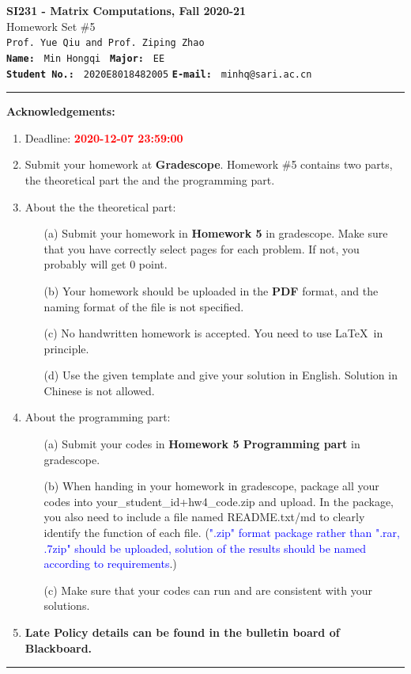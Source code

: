 \documentclass[english,onecolumn]{IEEEtran}
\begin{document}
\begin{center}
	\textbf{\LARGE{SI231 - Matrix Computations, Fall 2020-21}}\\
	{\Large Homework Set \#5}\\
	\texttt{Prof. Yue Qiu and Prof. Ziping Zhao}\\
	\texttt{\textbf{Name:}}   	\texttt{ Min Hongqi }  		\hspace{1bp}
	\texttt{\textbf{Major:}}  	\texttt{ EE } 	\\
	\texttt{\textbf{Student No.:}} 	\texttt{ 2020E8018482005}     \hspace{1bp}
	\texttt{\textbf{E-mail:}} 	\texttt{ minhq@sari.ac.cn}
\par\end{center}

\noindent
\rule{\linewidth}{0.4pt}
{\bf {\large Acknowledgements:}}
\begin{enumerate}
    \item Deadline: \textcolor{red}{\textbf{2020-12-07 23:59:00}}
    \item Submit your homework at \textbf{Gradescope}.
    Homework \#5 contains two parts, the theoretical part the and the programming part.
    \item About the the theoretical part:
    \begin{enumerate}
            \item[(a)] Submit your homework in \textbf{Homework 5} in gradescope. Make sure that you have correctly select pages for each problem. If not, you probably will get 0 point.
            \item[(b)] Your homework should be uploaded in the \textbf{PDF} format, and the naming format of the file is not specified.
            \item[(c)] No handwritten homework is accepted. You need to use \LaTeX $\,$ in principle.
            \item[(d)] Use the given template and give your solution in English. Solution in Chinese is not allowed. 
        \end{enumerate}
  \item About the programming part:
  \begin{enumerate}
      \item[(a)] Submit your codes in \textbf{Homework 5 Programming part} in gradescope. 
      \item[(b)] When handing in your homework in gradescope, package all your codes into {\sf your\_student\_id+hw4\_code.zip} and upload. In the package, you also need to include a file named {\sf README.txt/md} to clearly identify the function of each file. (\textcolor{blue}{".zip" format package rather than ".rar, .7zip" should be uploaded, solution of the results should be named according to requirements}.)
     \item[(c)] Make sure that your codes can run and are consistent with your solutions.
  \end{enumerate}
  \item \textbf{Late Policy details can be found in the bulletin board of Blackboard.}
\end{enumerate}
\rule{\linewidth}{0.4pt}
\end{document}
